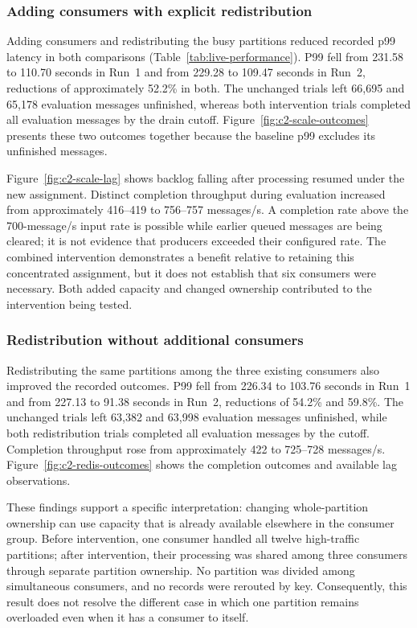 \documentclass[10pt]{article}
\begin{document}
\subsubsection{Adding consumers with explicit redistribution}
\label{sec:combined-results}

Adding consumers and redistributing the busy partitions reduced recorded p99 latency in both comparisons (Table~\ref{tab:live-performance}). P99 fell from 231.58 to 110.70 seconds in Run~1 and from 229.28 to 109.47 seconds in Run~2, reductions of approximately 52.2\% in both. The unchanged trials left 66,695 and 65,178 evaluation messages unfinished, whereas both intervention trials completed all evaluation messages by the drain cutoff. Figure~\ref{fig:c2-scale-outcomes} presents these two outcomes together because the baseline p99 excludes its unfinished messages.

Figure~\ref{fig:c2-scale-lag} shows backlog falling after processing resumed under the new assignment. Distinct completion throughput during evaluation increased from approximately 416--419 to 756--757 messages/s. A completion rate above the 700-message/s input rate is possible while earlier queued messages are being cleared; it is not evidence that producers exceeded their configured rate. The combined intervention demonstrates a benefit relative to retaining this concentrated assignment, but it does not establish that six consumers were necessary. Both added capacity and changed ownership contributed to the intervention being tested.

\subsubsection{Redistribution without additional consumers}
\label{sec:redistribution-results}

Redistributing the same partitions among the three existing consumers also improved the recorded outcomes. P99 fell from 226.34 to 103.76 seconds in Run~1 and from 227.13 to 91.38 seconds in Run~2, reductions of 54.2\% and 59.8\%. The unchanged trials left 63,382 and 63,998 evaluation messages unfinished, while both redistribution trials completed all evaluation messages by the cutoff. Completion throughput rose from approximately 422 to 725--728 messages/s. Figure~\ref{fig:c2-redis-outcomes} shows the completion outcomes and available lag observations.

These findings support a specific interpretation: changing whole-partition ownership can use capacity that is already available elsewhere in the consumer group. Before intervention, one consumer handled all twelve high-traffic partitions; after intervention, their processing was shared among three consumers through separate partition ownership. No partition was divided among simultaneous consumers, and no records were rerouted by key. Consequently, this result does not resolve the different case in which one partition remains overloaded even when it has a consumer to itself.
\end{document}
